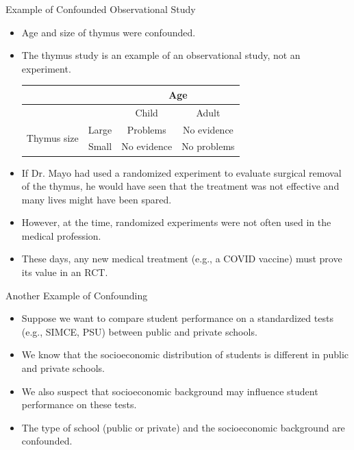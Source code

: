\documentclass[handout]{beamer}
\begin{document}
\begin{frame}{Example of Confounded Observational Study}
\scriptsize{

\begin{itemize}


\item Age and size of thymus were confounded.

\item The thymus study is an example of an observational study, not an experiment.

\begin{table}
\center
 \begin{tabular}{|c|ccc|}  \hline
 
& & \multicolumn{2}{c|}{Age} \\ \hline
& & Child & Adult \\
\multirow{2}{*}{ Thymus size } & Large & Problems & No evidence \\ 
& Small & No evidence & No problems \\ \hline
\end{tabular} 
\end{table}

\item If Dr. Mayo had used a randomized experiment to evaluate surgical removal of the thymus, he would have seen that the treatment was not effective and many lives might have been
spared. 
\item However, at the time, randomized experiments were not often used in the medical profession.
  
\item These days, any new medical treatment (e.g., a COVID vaccine) must prove its value in an RCT.  
\end{itemize}



} 
\end{frame}

\begin{frame}{Another Example of Confounding}
\scriptsize{

\begin{itemize}

\item Suppose we want to compare student performance on a standardized tests (e.g., SIMCE, PSU) between public and private schools.

\item We know that the socioeconomic distribution of students is different in public and private schools.

\item We also suspect that socioeconomic background may influence student performance on these tests.

\item The type of school (public or private) and the socioeconomic background are confounded.
  
\end{itemize}



} 
\end{frame}
\end{document}
